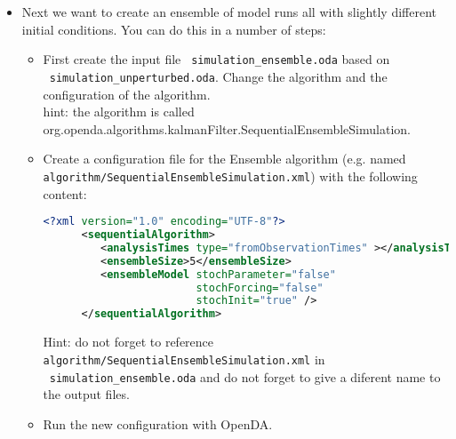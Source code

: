 \begin{itemize}
      To create a movie with both results in python type:
      \begin{lstlisting}[language=Python,frame=single,caption={Python initialize}]
      import simulation_unperturbed_results as unperturbed
      import simulation_perturbed_results as perturbed
      p.plot_movie(unperturbed.model_time,unperturbed.x,perturbed.x)
      \end{lstlisting}

      To create a time-series plot with both results in Python type:
      \begin{lstlisting}[language=Python,frame=single,caption={Python}]
      plt.subplot(2,1,1)
      plt.plot(unperturbed.model_time,unperturbed.x[:,0],"b") 
      #python counts starting at 0
      plt.plot(perturbed.model_time,perturbed.x[:,0],"g")
      plt.ylabel(r"$\theta_1$") # use latex for label
      plt.subplot(2,1,2)
      plt.plot(unperturbed.model_time,unperturbed.x[:,1],"b")
      plt.plot(perturbed.model_time,perturbed.x[:,1],"g")
      plt.ylabel(r"$\theta_2$")
      plt.show() 
      \end{lstlisting}
      
\item Next we want to create an ensemble of model runs all with slightly different initial conditions. 
      You can do this in a number of steps:
      \begin{itemize}
      \item First create the input file \texttt{ simulation\_ensemble.oda} based on\\
            \texttt{ simulation\_unperturbed.oda}. Change the algorithm and the
            configuration of the algorithm.\\
            hint: the algorithm is called \\
            org.openda.algorithms.kalmanFilter.SequentialEnsembleSimulation.
      \item Create a configuration file for the Ensemble algorithm (e.g. named
            \texttt{ algorithm/SequentialEnsembleSimulation.xml}) with the following content:
      \begin{lstlisting}[language=XML,frame=single,caption={XML-input for sequentialAlgorithm}]
      <?xml version="1.0" encoding="UTF-8"?>
      <sequentialAlgorithm>
         <analysisTimes type="fromObservationTimes" ></analysisTimes>
         <ensembleSize>5</ensembleSize>
         <ensembleModel stochParameter="false"
                        stochForcing="false"
                        stochInit="true" />
      </sequentialAlgorithm>
      \end{lstlisting}
      Hint: do not forget to reference \texttt{ algorithm/SequentialEnsembleSimulation.xml} in \\ \texttt{ simulation\_ensemble.oda}
      and do not forget to give a diferent name to the output files.
      \item Run the new configuration with OpenDA.


\end{itemize}
\end{itemize}
